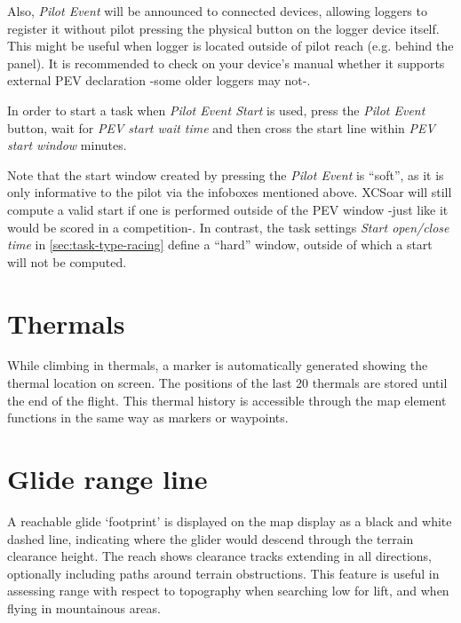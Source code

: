 Also, \emph{Pilot Event} will be announced to connected devices, allowing loggers to
register it without pilot pressing the physical button on the logger device
itself. This might be useful when logger is located outside of pilot reach
(e.g. behind the panel). It is recommended to check on your device's manual 
whether it supports external PEV declaration -some older loggers may not-.

In order to start a task when \emph{Pilot Event Start} is used, press the \emph
{Pilot Event} button, wait for \emph{PEV start wait time} and then cross the
start line within \emph{PEV start window} minutes.

\tip Note that the start window created by pressing the \emph{Pilot Event}
is ``soft'', as it is only informative to the pilot via the infoboxes mentioned above.
XCSoar will still compute a valid start if one is performed outside of 
the PEV window -just like it would be scored in a competition-. In contrast,
the task settings \emph{Start open/close time} in \ref{sec:task-type-racing} define
a ``hard'' window, outside of which a start will not be computed.


\section{Thermals}

While climbing in thermals, a marker is automatically generated showing the
thermal location on screen.    The positions of the last 20 thermals are
stored until the end of the flight.
This thermal history is accessible through the map
element functions in the same way as markers or waypoints.


\section{Glide range line}\label{sec:reach}

A reachable glide `footprint' is displayed on the map display as a
black and white dashed line, indicating where the glider would descend
through the terrain clearance height.  The reach shows clearance
tracks extending in all directions, optionally including paths around
terrain obstructions.  This feature is useful in assessing range with
respect to topography when searching low for lift, and when flying in
mountainous areas.

